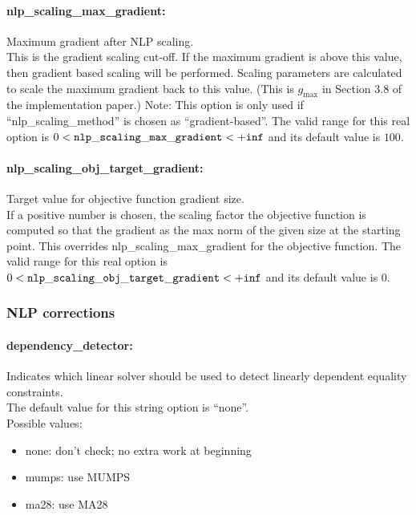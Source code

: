 \paragraph{nlp\_scaling\_max\_gradient:} Maximum gradient after NLP scaling. $\;$ \\
 This is the gradient scaling cut-off. If the
maximum gradient is above this value, then
gradient based scaling will be performed. Scaling
parameters are calculated to scale the maximum
gradient back to this value. (This is $g_{\max}$ in
Section 3.8 of the implementation paper.) Note:
This option is only used if
``nlp\_scaling\_method'' is chosen as
``gradient-based''. The valid range for this real option is 
$0 <  {\tt nlp\_scaling\_max\_gradient } <  {\tt +inf}$
and its default value is $100$.

\paragraph{nlp\_scaling\_obj\_target\_gradient:} Target value for objective function gradient size. $\;$ \\
     If a positive number is chosen, the scaling factor the objective function
     is computed so that the gradient as the max norm of the given size at the
     starting point.  This overrides nlp\_scaling\_max\_gradient for the
     objective function.
The valid range for this real option is 
$0 <  {\tt nlp\_scaling\_obj\_target\_gradient } <  {\tt +inf}$
and its default value is $0$.

\subsubsection{NLP corrections}

\paragraph{dependency\_detector:} Indicates which linear solver should be used to detect linearly dependent equality constraints. $\;$ \\
The default value for this string option is ``none''.
\\ 
Possible values:
\begin{itemize}
\item none:                    don't check; no extra work at beginning
\item mumps:                   use MUMPS
\item ma28:                     use MA28
\end{itemize}

